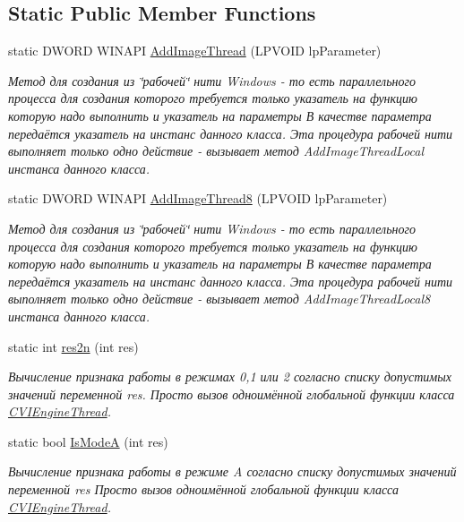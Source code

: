 \subsection*{Static Public Member Functions}
\begin{DoxyCompactItemize}
\item 
static D\+W\+O\+R\+D W\+I\+N\+A\+P\+I \hyperlink{class_c_v_i_engine_base_ad9c65ff1caec8b5042fd55628c515373}{Add\+Image\+Thread} (L\+P\+V\+O\+I\+D lp\+Parameter)
\begin{DoxyCompactList}\small\item\em Метод для создания из \char`\"{}рабочей\char`\"{} нити Windows -\/ то есть параллельного процесса для создания которого требуется только указатель на функцию которую надо выполнить и указатель на параметры В качестве параметра передаётся указатель на инстанс данного класса. Эта процедура рабочей нити выполняет только одно действие -\/ вызывает метод Add\+Image\+Thread\+Local инстанса данного класса. \end{DoxyCompactList}\item 
static D\+W\+O\+R\+D W\+I\+N\+A\+P\+I \hyperlink{class_c_v_i_engine_base_acb273d8d1df0ad615bec58b0a9c5f1cc}{Add\+Image\+Thread8} (L\+P\+V\+O\+I\+D lp\+Parameter)
\begin{DoxyCompactList}\small\item\em Метод для создания из \char`\"{}рабочей\char`\"{} нити Windows -\/ то есть параллельного процесса для создания которого требуется только указатель на функцию которую надо выполнить и указатель на параметры В качестве параметра передаётся указатель на инстанс данного класса. Эта процедура рабочей нити выполняет только одно действие -\/ вызывает метод Add\+Image\+Thread\+Local8 инстанса данного класса. \end{DoxyCompactList}\item 
static int \hyperlink{class_c_v_i_engine_base_a96058275b74d792351596a389ee29bbd}{res2n} (int res)
\begin{DoxyCompactList}\small\item\em Вычисление признака работы в режимах 0,1 или 2 согласно списку допустимых значений переменной res. Просто вызов одноимённой глобальной функции класса \hyperlink{class_c_v_i_engine_thread}{C\+V\+I\+Engine\+Thread}. \end{DoxyCompactList}\item 
static bool \hyperlink{class_c_v_i_engine_base_a2f8fba45abd4bb564101fb090de26a48}{Is\+Mode\+A} (int res)
\begin{DoxyCompactList}\small\item\em Вычисление признака работы в режиме A согласно списку допустимых значений переменной res Просто вызов одноимённой глобальной функции класса \hyperlink{class_c_v_i_engine_thread}{C\+V\+I\+Engine\+Thread}. \end{DoxyCompactList}\item 

\end{DoxyCompactItemize}
